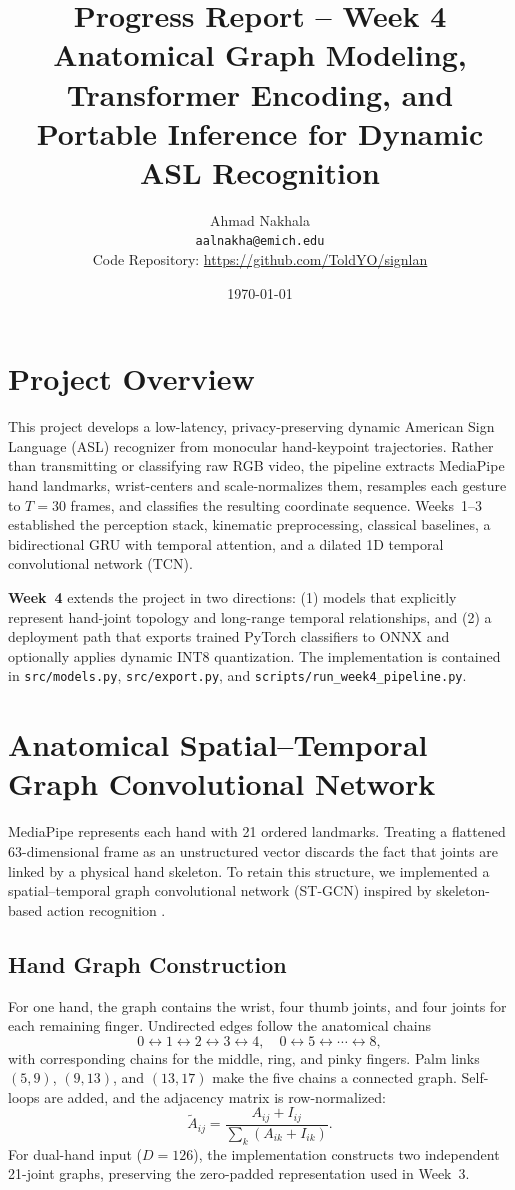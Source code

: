 \documentclass{article}
\title{Progress Report -- Week 4\\
\large Anatomical Graph Modeling, Transformer Encoding, and Portable Inference for Dynamic ASL Recognition}
\author{Ahmad Nakhala\\
\texttt{aalnakha@emich.edu}\\
\vspace{0.3em}
\normalsize Code Repository: \url{https://github.com/ToldYO/signlan}}
\date{\today}
\begin{document}
\maketitle

\section*{Project Overview}
This project develops a low-latency, privacy-preserving dynamic American Sign Language (ASL) recognizer from monocular hand-keypoint trajectories. Rather than transmitting or classifying raw RGB video, the pipeline extracts MediaPipe hand landmarks, wrist-centers and scale-normalizes them, resamples each gesture to $T=30$ frames, and classifies the resulting coordinate sequence. Weeks~1--3 established the perception stack, kinematic preprocessing, classical baselines, a bidirectional GRU with temporal attention, and a dilated 1D temporal convolutional network (TCN).

\textbf{Week~4} extends the project in two directions: (1) models that explicitly represent hand-joint topology and long-range temporal relationships, and (2) a deployment path that exports trained PyTorch classifiers to ONNX and optionally applies dynamic INT8 quantization. The implementation is contained in \texttt{src/models.py}, \texttt{src/export.py}, and \texttt{scripts/run\_week4\_pipeline.py}.

\section*{Anatomical Spatial--Temporal Graph Convolutional Network}
MediaPipe represents each hand with 21 ordered landmarks. Treating a flattened 63-dimensional frame as an unstructured vector discards the fact that joints are linked by a physical hand skeleton. To retain this structure, we implemented a spatial--temporal graph convolutional network (ST-GCN) inspired by skeleton-based action recognition \cite{yan2018spatial}.

\subsection*{Hand Graph Construction}
For one hand, the graph contains the wrist, four thumb joints, and four joints for each remaining finger. Undirected edges follow the anatomical chains
\[
0\!\leftrightarrow\!1\!\leftrightarrow\!2\!\leftrightarrow\!3\!\leftrightarrow\!4,
\quad 0\!\leftrightarrow\!5\!\leftrightarrow\!\cdots\!\leftrightarrow\!8,
\]
with corresponding chains for the middle, ring, and pinky fingers. Palm links $(5,9)$, $(9,13)$, and $(13,17)$ make the five chains a connected graph. Self-loops are added, and the adjacency matrix is row-normalized:
\[
\widetilde{A}_{ij} = \frac{A_{ij} + I_{ij}}{\sum_k (A_{ik}+I_{ik})}.
\]
For dual-hand input ($D=126$), the implementation constructs two independent 21-joint graphs, preserving the zero-padded representation used in Week~3.
\end{document}
